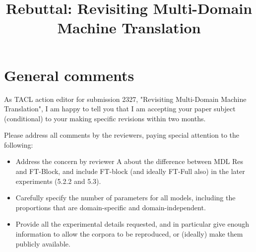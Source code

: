 \documentclass[12pt,times,a4paper,twoside]{article}
\title{Rebuttal: Revisiting Multi-Domain Machine Translation}
\author{}
\date{}
\theoremstyle{definition}
\begin{document}
\maketitle
\section*{General comments}
As TACL action editor for submission 2327, "Revisiting Multi-Domain Machine Translation", I am happy to tell you that I am accepting your paper subject (conditional) to your making specific revisions within two months.

Please address all comments by the reviewers, paying special attention to the following:
\begin{itemize}
	\item Address the concern by reviewer A about the difference between MDL Res and FT-Block, and include FT-block (and ideally FT-Full also) in the later experiments (5.2.2 and 5.3).
	\item Carefully specify the number of parameters for all models, including the proportions that are domain-specific and domain-independent.
	\item Provide all the experimental details requested, and in particular give enough information to allow the corpora to be reproduced, or (ideally) make them publicly available.
\end{itemize}
\end{document}
